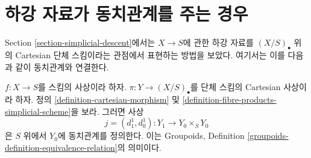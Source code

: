 \section{하강 자료가 동치관계를 주는 경우}
\label{section-equivalence-relation}

\noindent
Section \ref{section-simplicial-descent}에서는 $X \to S$에 관한
하강 자료를 $(X/S)_\bullet$ 위의 Cartesian 단체 스킴이라는 관점에서
표현하는 방법을 보았다. 여기서는 이를 다음과 같이 동치관계와 연결한다.

\begin{lemma}
\label{lemma-equivalence-relation}
$f : X \to S$를 스킴의 사상이라 하자.
$\pi : Y \to (X/S)_\bullet$를 단체 스킴의 Cartesian 사상이라 하자.
정의 \ref{definition-cartesian-morphism} 및
\ref{definition-fibre-products-simplicial-scheme}을 보라.
그러면 사상
$$
j = (d^1_1, d^1_0) : Y_1 \to Y_0 \times_S Y_0
$$
은 $S$ 위에서 $Y_0$에 동치관계를 정의한다. 이는 Groupoids,
Definition \ref{groupoids-definition-equivalence-relation}의 의미이다.
\end{lemma}

